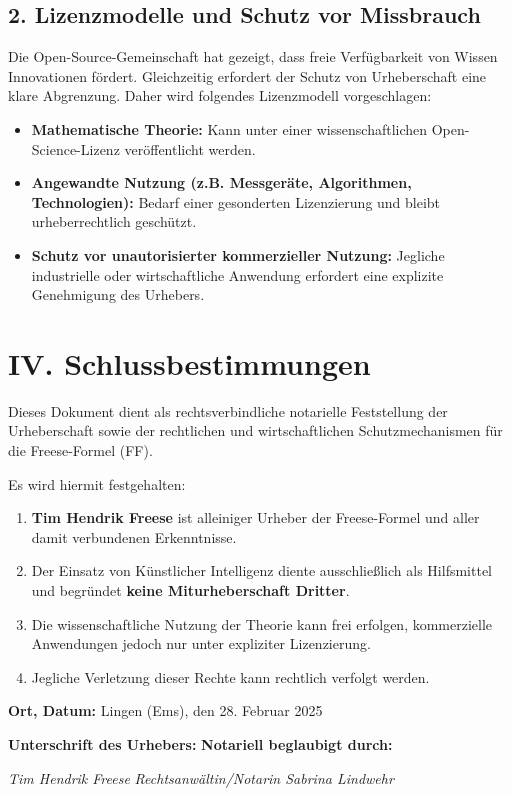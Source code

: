 \documentclass[a4paper,12pt]{article}
\begin{document}
\subsection*{2. Lizenzmodelle und Schutz vor Missbrauch}
Die Open-Source-Gemeinschaft hat gezeigt, dass freie Verfügbarkeit von Wissen Innovationen fördert. Gleichzeitig erfordert der Schutz von Urheberschaft eine klare Abgrenzung. Daher wird folgendes Lizenzmodell vorgeschlagen:

\begin{itemize}
    \item \textbf{Mathematische Theorie:} Kann unter einer wissenschaftlichen Open-Science-Lizenz veröffentlicht werden.
    \item \textbf{Angewandte Nutzung (z.B. Messgeräte, Algorithmen, Technologien):} Bedarf einer gesonderten Lizenzierung und bleibt urheberrechtlich geschützt.
    \item \textbf{Schutz vor unautorisierter kommerzieller Nutzung:} Jegliche industrielle oder wirtschaftliche Anwendung erfordert eine explizite Genehmigung des Urhebers.
\end{itemize}

\section*{IV. Schlussbestimmungen}
Dieses Dokument dient als rechtsverbindliche notarielle Feststellung der Urheberschaft sowie der rechtlichen und wirtschaftlichen Schutzmechanismen für die Freese-Formel (FF). 

Es wird hiermit festgehalten:
\begin{enumerate}
    \item \textbf{Tim Hendrik Freese} ist alleiniger Urheber der Freese-Formel und aller damit verbundenen Erkenntnisse.
    \item Der Einsatz von Künstlicher Intelligenz diente ausschließlich als Hilfsmittel und begründet \textbf{keine Miturheberschaft Dritter}.
    \item Die wissenschaftliche Nutzung der Theorie kann frei erfolgen, kommerzielle Anwendungen jedoch nur unter expliziter Lizenzierung.
    \item Jegliche Verletzung dieser Rechte kann rechtlich verfolgt werden.
\end{enumerate}

\vspace{2cm}
\noindent
\textbf{Ort, Datum:} Lingen (Ems), den 28. Februar 2025

\vspace{1cm}
\noindent
\textbf{Unterschrift des Urhebers:} \hfill \textbf{Notariell beglaubigt durch:} 

\vspace{1.5cm}
\noindent
\makebox[7cm]{\hrulefill} \hfill \makebox[7cm]{\hrulefill}

\textit{Tim Hendrik Freese} \hfill \textit{Rechtsanwältin/Notarin Sabrina Lindwehr}
\end{document}
